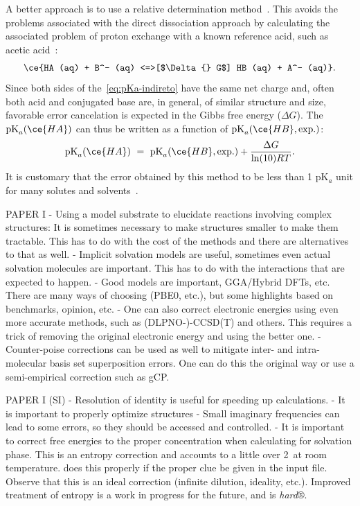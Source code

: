 A better approach is to use a relative determination method~\cite{Ding_2009}.
This avoids the problems associated with the direct dissociation approach
by calculating the associated problem of proton exchange with a known reference
acid,
such as acetic acid~\cite{Goldberg_2002}:
%
\begin{equation}
	\ce{HA (aq) + B^- (aq) <=>[$\Delta{} G$] HB (aq) + A^- (aq)}\text{.}
	\label{eq:pKa-indireto}
\end{equation}
%
Since both sides of the~\cref{eq:pKa-indireto}
have the same net charge and,
often both acid and conjugated base are,
in
general,
of similar structure and size,
favorable error cancelation is expected
in the Gibbs free energy ($\Delta G$).
The $\text{pK}_a(\ce{HA})$
can thus be written as a function of $\text{pK}_a(\ce{HB},
	\text{exp.})$:
%
\begin{equation}
	\text{pK}_a(\ce{HA})~=~\text{pK}_a(\ce{HB},
	\text{exp.}) + \frac{\Delta G}{\ln(10) R T}\text{.}
\end{equation}
%
It is customary that the error obtained by this method to be less than 1 pK$_a$
unit for many solutes and solvents~\cite{Ding_2009}.

\clearpage


PAPER I
- Using a model substrate to elucidate reactions involving complex structures:
It is sometimes necessary to make structures smaller to make them tractable.
This has to do with the cost of the methods and there are alternatives to that as well.
- Implicit solvation models are useful,
sometimes even actual solvation molecules are important.
This has to do with the interactions that are expected to happen.
- Good models are important,
GGA/Hybrid DFTs,
etc.
There are many ways of choosing (PBE0,
etc.),
but some highlights based on benchmarks,
opinion,
etc.
- One can also correct electronic energies using even more accurate methods,
such as (DLPNO-)-CCSD(T) and others.
This requires a trick of removing the original electronic energy and using the better one.
- Counter-poise corrections can be used as well to mitigate inter- and intra-molecular basis set superposition errors.
One can do this the original way or use a semi-empirical correction such as gCP.\@

PAPER I (SI)
- Resolution of identity is useful for speeding up calculations.
- It is important to properly optimize structures
- Small imaginary frequencies can lead to some errors,
so they should be accessed and controlled.
- It is important to correct free energies to the proper
concentration when calculating for solvation phase.
This is an entropy correction and accounts to
a little over 2~\kcalmol at room temperature.
\overreact{} does this properly if the proper clue be
given in the input file.
Observe that this is an ideal correction (infinite dilution,
ideality,
etc.).
Improved treatment of entropy is a work in progress for the future,
and is \emph{hard}®.

